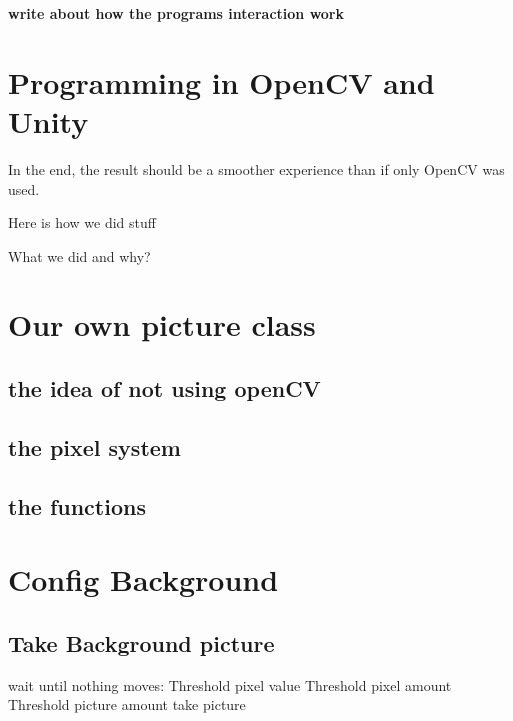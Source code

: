 \textbf{write about how the programs interaction work}
\section{Programming in OpenCV and Unity}

In the end, the result should be a smoother experience than if only OpenCV was used.

Here is how we did stuff

What we did and why?

\section{Our own picture class}
\subsection{the idea of not using openCV}
\subsection{the pixel system}
\subsection{the functions}

\section{Config Background}
\subsection{Take Background picture}
wait until nothing moves:
	Threshold pixel value
	Threshold pixel amount
	Threshold picture amount
take picture
